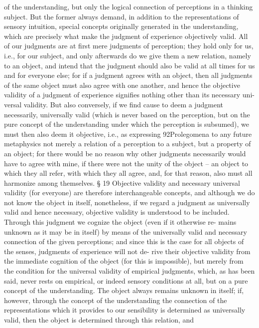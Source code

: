 of the understanding, but only the logical connection of perceptions in
a thinking subject. But the former always demand, in addition to the
representations of sensory intuition, special concepts originally generated
in the understanding, which are precisely what make the judgment of
experience objectively valid.
All of our judgments are at ﬁrst mere judgments of perception; they
hold only for us, i.e., for our subject, and only afterwards do we give
them a new relation, namely to an object, and intend that the judgment
should also be valid at all times for us and for everyone else; for if a
judgment agrees with an object, then all judgments of the same object
must also agree with one another, and hence the objective validity of a
judgment of experience signiﬁes nothing other than its necessary uni-
versal validity. But also conversely, if we ﬁnd cause to deem a judgment
necessarily, universally valid (which is never based on the perception, but
on the pure concept of the understanding under which the perception
is subsumed), we must then also deem it objective, i.e., as expressing
92Prolegomena to any future metaphysics
not merely a relation of a perception to a subject, but a property of an
object; for there would be no reason why other judgments necessarily
would have to agree with mine, if there were not the unity of the object –
an object to which they all refer, with which they all agree, and, for that
reason, also must all harmonize among themselves.
§ 19
Objective validity and necessary universal validity (for everyone) are
therefore interchangeable concepts, and although we do not know the
object in itself, nonetheless, if we regard a judgment as universally valid
and hence necessary, objective validity is understood to be included.
Through this judgment we cognize the object (even if it otherwise re-
mains unknown as it may be in itself) by means of the universally valid
and necessary connection of the given perceptions; and since this is the
case for all objects of the senses, judgments of experience will not de-
rive their objective validity from the immediate cognition of the object
(for this is impossible), but merely from the condition for the universal
validity of empirical judgments, which, as has been said, never rests on
empirical, or indeed sensory conditions at all, but on a pure concept
of the understanding. The object always remains unknown in itself; if,
however, through the concept of the understanding the connection of
the representations which it provides to our sensibility is determined as
universally valid, then the object is determined through this relation, and
